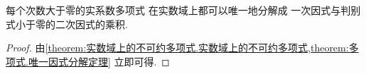 \begin{theorem}[实系数多项式唯一因式分解定理]
每个次数大于零的实系数多项式
在实数域上都可以唯一地分解成
一次因式与判别式小于零的二次因式的乘积.
\begin{proof}
由\cref{theorem:实数域上的不可约多项式.实数域上的不可约多项式,theorem:多项式.唯一因式分解定理}
立即可得.
\end{proof}
\end{theorem}
